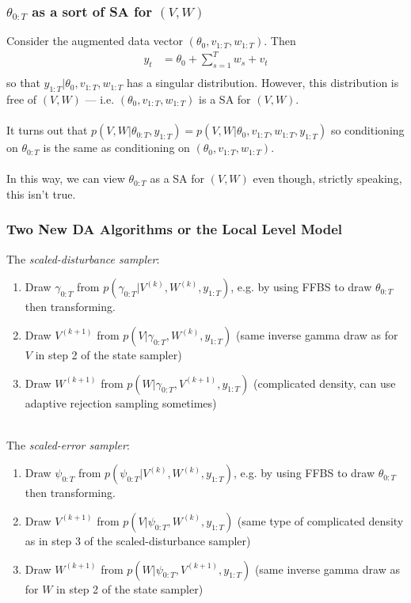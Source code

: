 \documentclass[xcolor=dvipsnames]{beamer}
\begin{document}
\begin{frame}
  \frametitle{$\theta_{0:T}$ as a sort of SA for $(V,W)$}
  Consider the augmented data vector $(\theta_0, v_{1:T}, w_{1:T})$. Then
  \begin{align*}
    y_t & = \theta_0 + \textstyle\sum_{s=1}^Tw_s + v_t\\
  \end{align*}
  so that $y_{1:T}|\theta_0, v_{1:T}, w_{1:T}$ has a singular distribution. However, this distribution is free of $(V,W)$ --- i.e. $(\theta_0, v_{1:T}, w_{1:T})$ is a SA for $(V,W)$.\\~\\
  
  \pause
It turns out that $p(V,W|\theta_{0:T}, y_{1:T})=p(V,W|\theta_0, v_{1:T}, w_{1:T}, y_{1:T})$ so conditioning on $\theta_{0:T}$ is the same as conditioning on $(\theta_0, v_{1:T}, w_{1:T})$.\\~\\

In this way, we can view $\theta_{0:T}$ as a SA for $(V,W)$ even though, strictly speaking, this isn't true.
\end{frame}

\begin{frame}
  \frametitle{Two New DA Algorithms or the Local Level Model}
The {\it \color{red} scaled-disturbance sampler}:
\begin{enumerate}
\item Draw $\gamma_{0:T}$ from $p(\gamma_{0:T}|V^{(k)}, W^{(k)}, y_{1:T})$, e.g. by using FFBS to draw $\theta_{0:T}$ then transforming.
\item Draw $V^{(k+1)}$ from $p(V|\gamma_{0:T},W^{(k)}, y_{1:T})$ (same inverse gamma draw as for $V$ in step 2 of the state sampler)
\item Draw $W^{(k+1)}$ from $p(W|\gamma_{0:T}, V^{(k+1)}, y_{1:T})$ (complicated density, can use adaptive rejection sampling sometimes)\\~\\
\end{enumerate}
\pause
The {\it \color{red} scaled-error sampler}:
\begin{enumerate}
\item Draw $\psi_{0:T}$ from $p(\psi_{0:T}|V^{(k)}, W^{(k)}, y_{1:T})$, e.g. by using FFBS to draw $\theta_{0:T}$ then transforming.
\item Draw $V^{(k+1)}$ from $p(V|\psi_{0:T}, W^{(k)}, y_{1:T})$ (same type of complicated density as in step 3 of the scaled-disturbance sampler)
\item Draw $W^{(k+1)}$ from $p(W|\psi_{0:T},V^{(k+1)}, y_{1:T})$ (same inverse gamma draw as for $W$ in step 2 of the state sampler)
\end{enumerate}
\end{frame}
\end{document}
